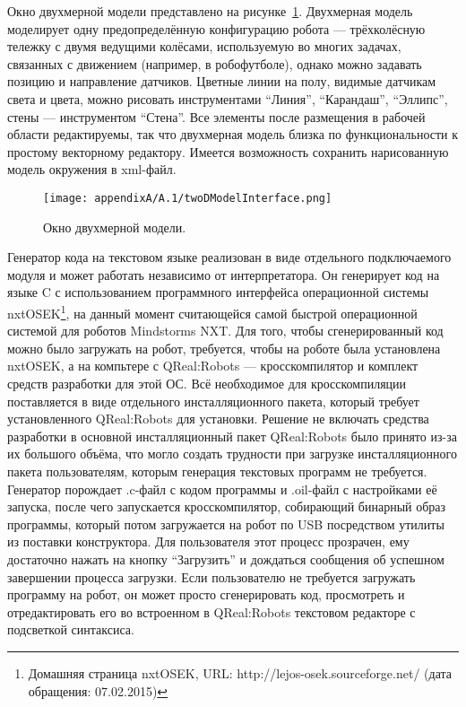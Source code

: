 Окно двухмерной модели представлено на рисунке~\ref{image:twoDModelInterface}. Двухмерная 
модель моделирует одну предопределённую конфигурацию робота --- трёхколёсную тележку 
с двумя ведущими колёсами, используемую во многих задачах, связанных с движением (например, 
в робофутболе), однако можно задавать позицию и направление датчиков. Цветные линии 
на полу, видимые датчикам света и цвета, можно рисовать инструментами "`Линия"', "`Карандаш"', 
"`Эллипс"', стены --- инструментом "`Стена"'. Все элементы после размещения в рабочей 
области редактируемы, так что двухмерная модель близка по функциональности к простому 
векторному редактору. Имеется возможность сохранить нарисованную модель окружения в xml-файл.

\begin{figure} [ht]
	\begin{center}
		\texttt{[image: appendixA/A.1/twoDModelInterface.png]}
		\caption{Окно двухмерной модели.}
		\label{image:twoDModelInterface}
	\end{center}
\end{figure}

Генератор кода на текстовом языке реализован в виде отдельного подключаемого модуля 
и может работать независимо от интерпретатора. Он генерирует код на языке C с использованием 
программного интерфейса операционной системы nxtOSEK\footnote{Домашняя страница nxtOSEK, URL: http://lejos-osek.sourceforge.net/ (дата обращения: 07.02.2015)},
на данный момент считающейся самой быстрой операционной системой для роботов Mindstorms NXT. 
Для того, чтобы сгенерированный код можно было загружать на робот, требуется, чтобы 
на роботе была установлена nxtOSEK, а на компьтере с QReal:Robots --- кросскомпилятор 
и комплект средств разработки для этой ОС. Всё необходимое для кросскомпиляции поставляется 
в виде отдельного инсталляционного пакета, который требует установленного QReal:Robots 
для установки. Решение не включать средства разработки в основной инсталляционный 
пакет QReal:Robots было принято из-за их большого объёма, что могло создать трудности 
при загрузке инсталляционного пакета пользователям, которым генерация текстовых программ 
не требуется. Генератор порождает .c-файл с кодом программы и .oil-файл с настройками 
её запуска, после чего запускается кросскомпилятор, собирающий бинарный образ программы, 
который потом загружается на робот по USB посредством утилиты из поставки конструктора. 
Для пользователя этот процесс прозрачен, ему достаточно нажать на кнопку "`Загрузить"' 
и дождаться сообщения об успешном завершении процесса загрузки. Если пользователю 
не требуется загружать программу на робот, он может просто сгенерировать код, просмотреть 
и отредактировать его во встроенном в QReal:Robots текстовом редакторе с подсветкой синтаксиса.


